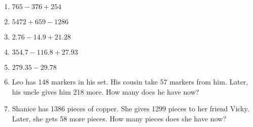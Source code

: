 \documentclass{article}
\begin{document}
\begin{enumerate}
\item \quad \( 765 - 376 + 254\)
\vspace{45pt}
\hline
\vspace{5pt}

\item \quad \( 5472 + 659 - 1286\)
\vspace{80pt}
\hline
\vspace{5pt}

\item \quad \( 2.76 - 14.9 + 21.28\)
\vspace{80pt}
\hline
\vspace{5pt}

\item \quad \( 354.7 - 116.8 + 27.93\)
\vspace{75pt}
\hline
\vspace{5pt}

\item \quad \( 279.35 - 29.78 \)
\vspace{80pt}
\hline
\vspace{5pt}

\item \quad Leo has 148 markers in his set. His cousin take 57 markers from him. Later, his uncle gives him 218 more. How many does he have now?
\vspace{80pt}
\hline
\vspace{5pt}

\item \quad Shanice has 1386 pieces of copper. She gives 1299 pieces to her friend Vicky. Later, she gets 58 more pieces. How many pieces does she have now?


\end{enumerate}
\end{document}
